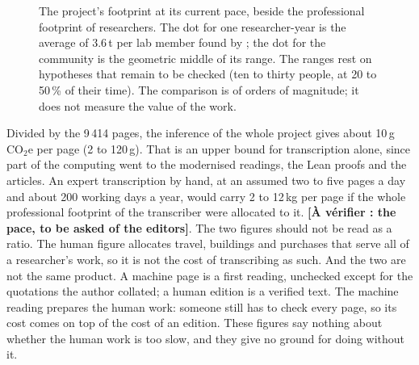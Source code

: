 \documentclass[11pt,a4paper]{article}
\newcommand{\rangerow}[5]{%
  \draw[rangefill, line width=7pt] (axis cs:#2,#1) -- (axis cs:#3,#1);
  \if\relax\detokenize{#4}\relax\else\fill[markblue] (axis cs:#4,#1) circle (2.6pt);\fi
  \node[anchor=west, font=\footnotesize, inner sep=3pt] at (axis cs:#3,#1) {#5};}
\newcommand{\todo}[1]{\textbf{[À vérifier : #1]}}
\begin{document}
\begin{figure}[h]\centering
{}
\caption{The project's footprint at its current pace, beside the professional footprint of researchers. The dot for one researcher-year is the average of 3.6\,t per lab member found by \citet{mariette2022}; the dot for the community is the geometric middle of its range. The ranges rest on hypotheses that remain to be checked (ten to thirty people, at 20 to 50\,\% of their time). The comparison is of orders of magnitude; it does not measure the value of the work.}\label{fig:scale}
\end{figure}


Divided by the 9\,414 pages, the inference of the whole project gives about 10\,g\,CO$_2$e per page (2 to 120\,g). That is an upper bound for transcription alone, since part of the computing went to the modernised readings, the Lean proofs and the articles. An expert transcription by hand, at an assumed two to five pages a day and about 200 working days a year, would carry 2 to 12\,kg per page if the whole professional footprint of the transcriber were allocated to it. \todo{the pace, to be asked of the editors}. The two figures should not be read as a ratio. The human figure allocates travel, buildings and purchases that serve all of a researcher's work, so it is not the cost of transcribing as such. And the two are not the same product. A machine page is a first reading, unchecked except for the quotations the author collated; a human edition is a verified text. The machine reading prepares the human work: someone still has to check every page, so its cost comes on top of the cost of an edition. These figures say nothing about whether the human work is too slow, and they give no ground for doing without it.
\end{document}
